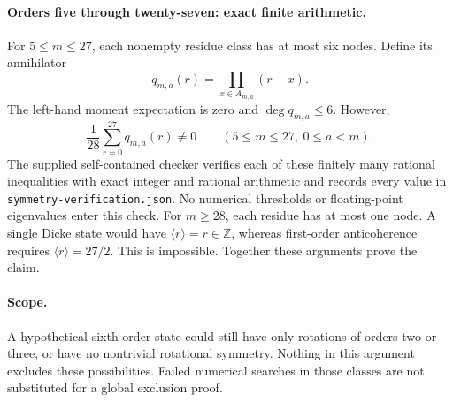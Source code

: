 \documentclass{article}
\begin{document}
\paragraph{Orders five through twenty-seven: exact finite arithmetic.}
For $5\le m\le27$, each nonempty residue class has at most six nodes.
Define its annihilator
\[
 q_{m,a}(r)=\prod_{x\in A_{m,a}}(r-x).
\]
The left-hand moment expectation is zero and $\deg q_{m,a}\le6$.
However,
\[
 \frac1{28}\sum_{r=0}^{27}q_{m,a}(r)\ne0
 \qquad(5\le m\le27,\ 0\le a<m).
\]
The supplied self-contained checker verifies each of these finitely many
rational inequalities with exact integer and rational arithmetic and
records every value in \texttt{symmetry-verification.json}. No numerical
thresholds or floating-point eigenvalues enter this check.
For $m\ge28$, each residue has at most one node. A single Dicke state
would have $\langle r\rangle=r\in\mathbb Z$, whereas first-order
anticoherence requires $\langle r\rangle=27/2$. This is impossible.
Together these arguments prove the claim.

\paragraph{Scope.}
A hypothetical sixth-order state could still have only rotations of
orders two or three, or have no nontrivial rotational symmetry. Nothing
in this argument excludes these possibilities. Failed numerical searches
in those classes are not substituted for a global exclusion proof.
\end{document}
